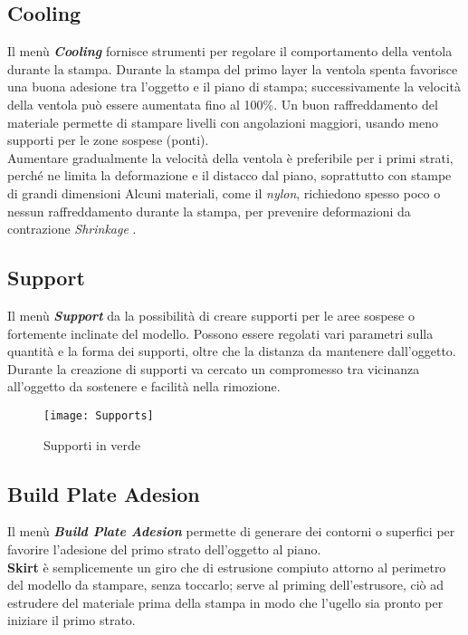 \subsection{Cooling}
Il menù \emph{\textbf{Cooling}} fornisce strumenti per regolare il comportamento della ventola durante la stampa. Durante la stampa del primo layer la ventola spenta favorisce una buona adesione tra l'oggetto e il piano di stampa; successivamente la velocità della ventola può essere aumentata fino al 100\%. Un buon raffreddamento del materiale permette di stampare livelli con angolazioni maggiori, usando meno supporti per le zone sospese (ponti).\\ Aumentare gradualmente la velocità della ventola è preferibile per i primi strati, perché ne limita la deformazione e il distacco dal piano, soprattutto con stampe di grandi dimensioni Alcuni materiali, come il \emph{nylon}, richiedono spesso poco o nessun raffreddamento durante la stampa, per prevenire deformazioni da contrazione \emph{Shrinkage} .

\subsection{Support}
Il menù \emph{\textbf{Support}} da la possibilità di creare supporti per le aree sospese o fortemente inclinate del modello. Possono essere regolati vari parametri sulla quantità e la forma dei supporti, oltre che la distanza da mantenere dall'oggetto. Durante la creazione di supporti va cercato un compromesso tra vicinanza all'oggetto da sostenere e facilità nella rimozione.
\begin{figure} [h]
	\centering
	\texttt{[image: Supports]}
    \caption{Supporti in verde}
    \label{fig:Supports}
\end{figure}

	
\subsection{Build Plate Adesion}
Il menù \emph{\textbf{Build Plate Adesion}} permette di generare dei contorni o superfici per favorire l'adesione del primo strato dell'oggetto al piano.\\

\textbf{Skirt} è semplicemente un giro che di estrusione compiuto attorno al perimetro del modello da stampare, senza toccarlo; serve al priming dell'estrusore, ciò ad estrudere del materiale prima della stampa in modo che l'ugello sia pronto per iniziare il primo strato.\\

